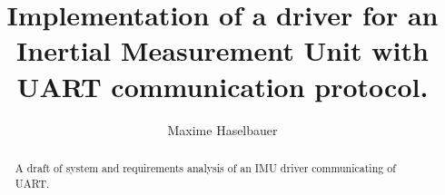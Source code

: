 \documentclass[a4paper,10pt]{article}
\title{Implementation of a driver for an Inertial Measurement Unit with UART communication protocol.}
\author{Maxime Haselbauer}
\begin{document}
\maketitle
\begin{abstract}
A draft of system and requirements analysis of an IMU driver communicating of UART.
\end{abstract}
\printnomenclature
\printglossaries








\printbibliography
\end{document}
